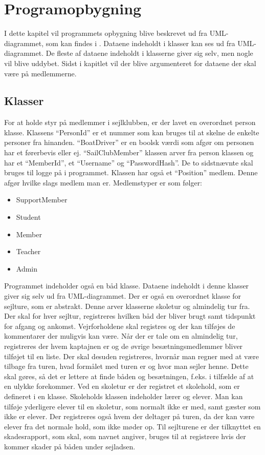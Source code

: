 \chapter{Programopbygning}

I dette kapitel vil programmets opbygning blive beskrevet ud fra UML-diagrammet, som kan findes i .
Dataene indeholdt i klasser kan ses ud fra UML-diagrammet. De fleste af dataene indeholdt i klasserne giver sig selv,
men nogle vil blive uddybet.
Sidst i kapitlet vil der blive argumenteret for dataene der skal være på medlemmerne.


\section{Klasser}

For at holde styr på medlemmer i sejlklubben, er der lavet en overordnet person klasse. Klassens ``PersonId'' er et
nummer som kan bruges til at skelne de enkelte personer fra hinanden. ``BoatDriver'' er en boolsk værdi som afgør om
personen har et førerbevis eller ej. ``SailClubMember'' klassen arver fra person klassen og har et ``MemberId'', et
``Username'' og ``PasswordHash''. De to sidstnævnte skal bruges til logge på i programmet. Klassen har også et
``Position'' medlem. Denne afgør hvilke slags medlem man er. Medlemstyper er som følger:

\begin{itemize}
\item SupportMember
\item Student
\item Member
\item Teacher
\item Admin
\end{itemize}

Programmet indeholder også en båd klasse. Dataene indeholdt i denne klasser giver sig selv ud fra UML-diagrammet. Der er
også en overordnet klasse for sejlture, som er abstrakt. Denne arver klasserne skoletur og almindelig tur fra. Der skal
for hver sejltur, registreres hvilken båd der bliver brugt samt tidspunkt for afgang og ankomst. Vejrforholdene skal
registres og der kan tilføjes de kommentarer der muligvis kan være. Når der er tale om en almindelig tur, registreres
der hvem kaptajnen er og de øvrige besætningsmedlemmer bliver tilføjet til en liste. Der skal desuden registreres,
hvornår man regner med at være tilbage fra turen, hvad formålet med turen er og hvor man sejler henne. Dette skal
gøres, så det er lettere at finde båden og besætningen, f.eks. i tilfælde af at en ulykke forekommer.
Ved en skoletur er der registret et skolehold, som er defineret i en klasse. Skoleholds klassen indeholder lærer og
elever. Man kan tilføje yderligere elever til en skoletur, som normalt ikke er med, samt gæster som ikke er elever. Der
registreres også hvem der deltager på turen, da der kan være elever fra det normale hold, som ikke møder op. Til
sejlturene er der tilknyttet en skadesrapport, som skal, som navnet angiver, bruges til at registrere hvis der kommer
skader på båden under sejladsen. 


